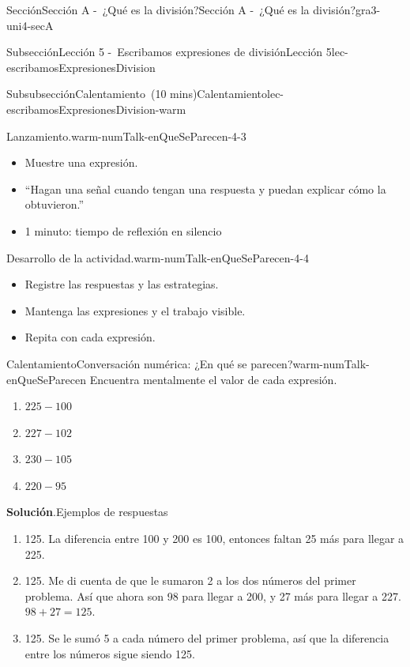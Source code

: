 \documentclass[oneside,10pt,]{article}
\newcommand{\blocktitlefont}{\relax}
\begin{document}
\begin{sectionptx}{Sección}{Sección A -~¿Qué es la división?}{}{Sección A -~¿Qué es la división?}{}{}{gra3-uni4-secA}
\begin{subsectionptx}{Subsección}{Lección 5 -~Escribamos expresiones de división}{}{Lección 5}{}{}{lec-escribamosExpresionesDivision}
\begin{subsubsectionptx}{Subsubsección}{Calentamiento~(10 mins)}{}{Calentamiento}{}{}{lec-escribamosExpresionesDivision-warm}
\begin{paragraphs}{Lanzamiento.}{warm-numTalk-enQueSeParecen-4-3}%
%
\begin{itemize}[label=\textbullet]
\item{}Muestre una expresión.%
\item{}``Hagan una señal cuando tengan una respuesta y puedan explicar cómo la obtuvieron.''%
\item{}1 minuto: tiempo de reflexión en silencio%
\end{itemize}
\end{paragraphs}%
\begin{paragraphs}{Desarrollo de la actividad.}{warm-numTalk-enQueSeParecen-4-4}%
%
\begin{itemize}[label=\textbullet]
\item{}Registre las respuestas y las estrategias.%
\item{}Mantenga las expresiones y el trabajo visible.%
\item{}Repita con cada expresión.%
\end{itemize}
\end{paragraphs}%
\begin{exploration}{Calentamiento}{Conversación numérica: ¿En qué se parecen?}{warm-numTalk-enQueSeParecen}%
Encuentra mentalmente el valor de cada expresión.%
\par
%
\begin{enumerate}[label={\Alph*.}]
\item{}\(\displaystyle 225 - 100\)%
\item{}\(\displaystyle 227 - 102\)%
\item{}\(\displaystyle 230 - 105\)%
\item{}\(\displaystyle 220 - 95\)%
\end{enumerate}
%
\par\smallskip%
\noindent\textbf{\blocktitlefont Solución}.\hypertarget{warm-numTalk-enQueSeParecen-3}{}\quad{}Ejemplos de respuestas%
\par
%
\begin{enumerate}[label={\Alph*.}]
\item{}125. La diferencia entre 100 y 200 es 100, entonces faltan 25 más para llegar a 225.%
\item{}125. Me di cuenta de que le sumaron 2 a los dos números del primer problema. Así que ahora son 98 para llegar a 200, y 27 más para llegar a 227. \(98+27=125\).%
\item{}125. Se le sumó 5 a cada número del primer problema, así que la diferencia entre los números sigue siendo 125.%

\end{enumerate}
\end{exploration}
\end{subsubsectionptx}
\end{subsectionptx}
\end{sectionptx}
\end{document}
